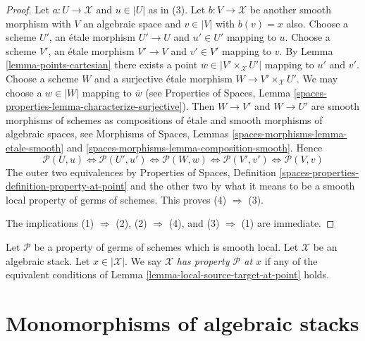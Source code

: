\begin{proof}
Let $a : U \to \mathcal{X}$ and $u \in |U|$ as in (3). Let
$b : V \to \mathcal{X}$ be another smooth morphism with $V$ an algebraic
space and $v \in |V|$ with $b(v) = x$ also.
Choose a scheme $U'$, an \'etale morphism $U' \to U$ and $u' \in U'$
mapping to $u$. Choose a scheme $V'$, an \'etale morphism $V' \to V$
and $v' \in V'$ mapping to $v$. By
Lemma \ref{lemma-points-cartesian}
there exists a point $\overline{w} \in |V' \times_\mathcal{X} U'|$
mapping to $u'$ and $v'$. Choose a scheme $W$ and a surjective \'etale
morphism $W \to V' \times_\mathcal{X} U'$. We may choose a
$w \in |W|$ mapping to $\overline{w}$ (see
Properties of Spaces,
Lemma \ref{spaces-properties-lemma-characterize-surjective}).
Then $W \to V'$ and $W \to U'$ are smooth morphisms of schemes
as compositions of \'etale and smooth morphisms of algebraic spaces, see
Morphisms of Spaces, Lemmas \ref{spaces-morphisms-lemma-etale-smooth} and
\ref{spaces-morphisms-lemma-composition-smooth}.
Hence
$$
\mathcal{P}(U, u)
\Leftrightarrow
\mathcal{P}(U', u')
\Leftrightarrow
\mathcal{P}(W, w)
\Leftrightarrow
\mathcal{P}(V', v')
\Leftrightarrow
\mathcal{P}(V, v)
$$
The outer two equivalences by
Properties of Spaces,
Definition \ref{spaces-properties-definition-property-at-point}
and the other two by what it means to be a smooth local property
of germs of schemes. This proves (4) $\Rightarrow$ (3).

\medskip\noindent
The implications (1) $\Rightarrow$ (2), (2) $\Rightarrow$ (4),
and (3) $\Rightarrow$ (1) are immediate.
\end{proof}

\begin{definition}
\label{definition-property-at-point}
Let $\mathcal{P}$ be a property of germs of schemes which is
smooth local. Let $\mathcal{X}$ be an algebraic stack.
Let $x \in |\mathcal{X}|$.
We say $\mathcal{X}$ {\it has property $\mathcal{P}$ at $x$}
if any of the equivalent conditions of
Lemma \ref{lemma-local-source-target-at-point}
holds.
\end{definition}










\section{Monomorphisms of algebraic stacks}
\label{section-monomorphisms}

